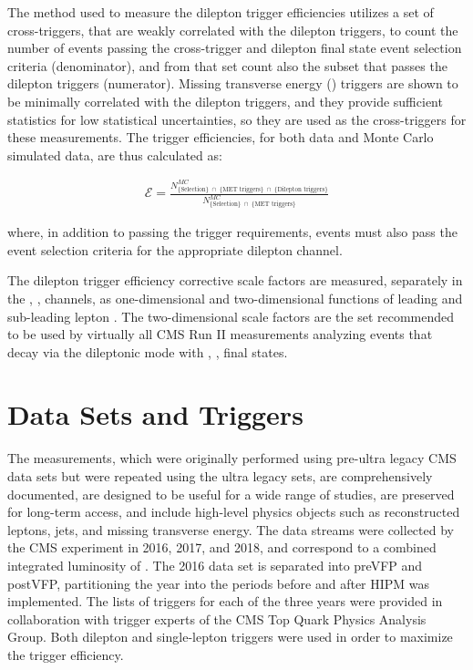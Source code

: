 The method used to measure the dilepton trigger efficiencies utilizes a set of cross-triggers, that are weakly correlated with the dilepton triggers, to count the number of events passing the cross-trigger and \ttbar dilepton final state event selection criteria (denominator), and from that set count also the subset that passes the dilepton triggers (numerator).
Missing transverse energy (\MET) triggers are shown to be minimally correlated with the dilepton triggers, and they provide sufficient statistics for low statistical uncertainties, so they are used as the cross-triggers for these measurements. 
The trigger efficiencies, for both data and Monte Carlo simulated data, are thus calculated as: 
\begin{linenomath*}
\begin{align}
\mathcal{E} = \frac{N^{MC}_{\{\text{Selection}\} \; \cap \; \{\text{MET triggers}\} \; \cap \; \{\text{Dilepton triggers\}}}}{N^{MC}_{\{\text{Selection}\} \; \cap \; \{\text{MET triggers\}}}}
\label{efficiency}
\end{align}
\end{linenomath*}
where, in addition to passing the trigger requirements, events must also pass the event selection criteria for the appropriate dilepton channel. 

The dilepton trigger efficiency corrective scale factors are measured, separately in the \ee, \emu, \mumu channels, as one-dimensional and two-dimensional functions of leading and sub-leading lepton \pT.
The two-dimensional scale factors are the set recommended to be used by virtually all CMS Run II measurements analyzing \ttbar events that decay via the dileptonic mode with \ee, \emu, \mumu final states.

\section{Data Sets and Triggers}
The measurements, which were originally performed using pre-ultra legacy CMS data sets but were repeated using the ultra legacy sets, are comprehensively documented, are designed to be useful for a wide range of studies, are preserved for long-term access, and include high-level physics objects such as reconstructed leptons, jets, and missing transverse energy.
The data streams were collected by the CMS experiment in 2016, 2017, and 2018, and correspond to a combined integrated luminosity of \lumivalueRuniiUL.
The 2016 data set is separated into preVFP and postVFP, partitioning the year into the periods before and after HIPM was implemented.
The lists of triggers for each of the three years were provided in collaboration with trigger experts of the CMS Top Quark Physics Analysis Group. 
Both dilepton and single-lepton triggers were used in order to maximize the trigger efficiency. 

